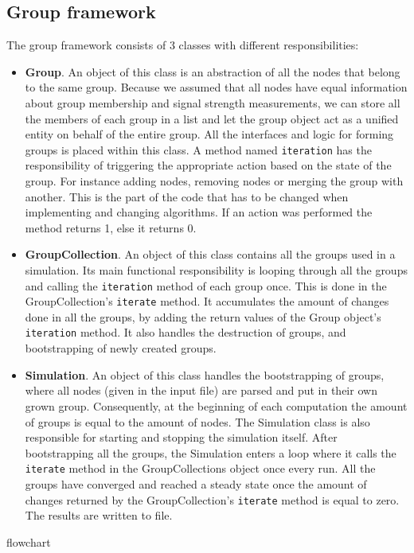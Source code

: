 \subsection{Group framework}
The group framework consists of 3 classes with different responsibilities:
\begin{itemize}
	\item \textbf{Group}. An object of this class is an abstraction of all the nodes that belong to the same group. Because we assumed that all nodes have equal
	information about group membership and signal strength measurements, we can store all the members of each group in a list and let the group object act as a unified entity on
	behalf of the entire group. All the interfaces and logic for forming groups is placed within this class. A method named \verb|iteration|
	has the responsibility of triggering the appropriate action based on the state of the group. For instance adding nodes, removing nodes or merging the group
	with another. This is the part of the code that has to be changed when implementing and changing algorithms. If an action was performed the method returns 1, else it returns 0. 

	\item \textbf{GroupCollection}. An object of this class contains all the groups used in a simulation. Its main functional responsibility is looping through all the groups
	and calling the \verb|iteration| method of each group once. This is done in the GroupCollection's \verb|iterate| method. It accumulates the amount of changes done in all the groups,
	by adding the return values of the Group object's \verb|iteration| method. It also handles the destruction of groups, and bootstrapping of newly created groups.

	\item \textbf{Simulation}. An object of this class handles the bootstrapping of groups, where all nodes (given in the input file) are parsed and
	put in their own grown group. Consequently, at the beginning of each computation the amount of groups is equal to the amount of nodes.
	The Simulation class is also responsible for starting and stopping the simulation itself. After bootstrapping all the groups, the Simulation enters a loop
	where it calls the \verb|iterate| method in the GroupCollections object once every run. All the groups have converged and reached a steady state 
	once the amount of changes returned by the GroupCollection's \verb|iterate| method is equal to zero. The results are written to file.
\end{itemize}
{{flowchart}}
